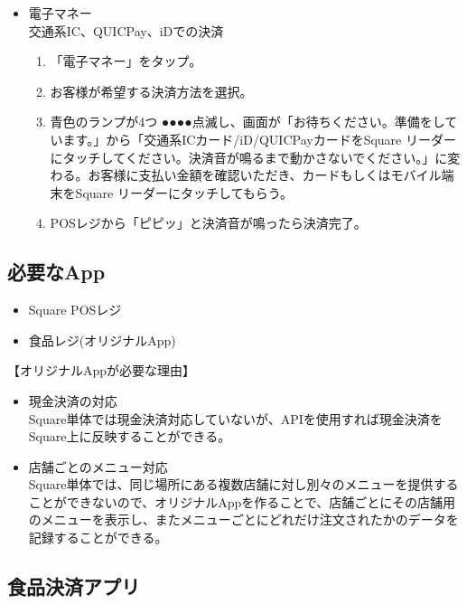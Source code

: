 \documentclass[dvipdfmx,jb5]{jreport}
\begin{document}
\begin{itemize}
\begin{itemize}
            \end{itemize}
      \item 電子マネー\\
            交通系IC、QUICPay、iDでの決済
            \begin{enumerate}[手順1]
                  \item 「電子マネー」をタップ。
                  \item お客様が希望する決済方法を選択。
                  \item 青色のランプが4つ{\color{blue} ●●●●}点滅し、画面が「お待ちください。準備をしています。」から「交通系ICカード/iD/QUICPayカードをSquare リーダーにタッチしてください。決済音が鳴るまで動かさないでください。」に変わる。お客様に支払い金額を確認いただき、カードもしくはモバイル端末をSquare リーダーにタッチしてもらう。
                  \item POSレジから「ピピッ」と決済音が鳴ったら決済完了。
            \end{enumerate}
\end{itemize}
\subsection{必要なApp}
\begin{itemize}
      \item Square POSレジ
      \item 食品レジ(オリジナルApp)
\end{itemize}
\begin{itembox}[l]{【オリジナルAppが必要な理由】}
      \begin{itemize}
            \item 現金決済の対応\\
                  Square単体では現金決済対応していないが、APIを使用すれば現金決済をSquare上に反映することができる。
            \item 店舗ごとのメニュー対応\\
                  Square単体では、同じ場所にある複数店舗に対し別々のメニューを提供することができないので、オリジナルAppを作ることで、店舗ごとにその店舗用のメニューを表示し、またメニューごとにどれだけ注文されたかのデータを記録することができる。
      \end{itemize}
\end{itembox}
\subsection{食品決済アプリ}
\end{document}
